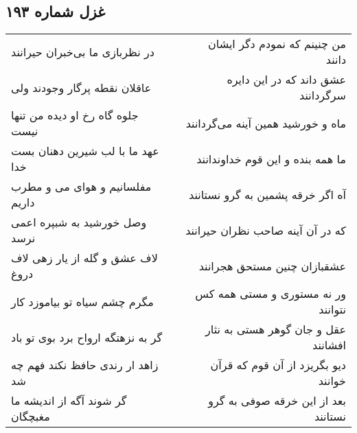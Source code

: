 \begin{center}
\section*{غزل شماره ۱۹۳}
\label{sec:sh193}
\begin{longtable}{l p{0.5cm} r}
در نظربازی ما بی‌خبران حیرانند
&&
من چنینم که نمودم دگر ایشان دانند
\\
عاقلان نقطه پرگار وجودند ولی
&&
عشق داند که در این دایره سرگردانند
\\
جلوه گاه رخ او دیده من تنها نیست
&&
ماه و خورشید همین آینه می‌گردانند
\\
عهد ما با لب شیرین دهنان بست خدا
&&
ما همه بنده و این قوم خداوندانند
\\
مفلسانیم و هوای می و مطرب داریم
&&
آه اگر خرقه پشمین به گرو نستانند
\\
وصل خورشید به شبپره اعمی نرسد
&&
که در آن آینه صاحب نظران حیرانند
\\
لاف عشق و گله از یار زهی لاف دروغ
&&
عشقبازان چنین مستحق هجرانند
\\
مگرم چشم سیاه تو بیاموزد کار
&&
ور نه مستوری و مستی همه کس نتوانند
\\
گر به نزهتگه ارواح برد بوی تو باد
&&
عقل و جان گوهر هستی به نثار افشانند
\\
زاهد ار رندی حافظ نکند فهم چه شد
&&
دیو بگریزد از آن قوم که قرآن خوانند
\\
گر شوند آگه از اندیشه ما مغبچگان
&&
بعد از این خرقه صوفی به گرو نستانند
\\
\end{longtable}
\end{center}
